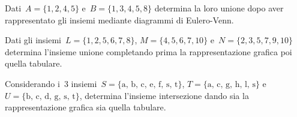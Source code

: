 \begin{esercizio}
 \label{ese:7.7}
Dati~$A=\{1,2,4,5\}$ e~$B=\{1,3,4,5,8\}$ determina la loro unione dopo
aver rappresentato gli insiemi mediante diagrammi di Eulero-Venn.
 \end{esercizio}

\begin{esercizio}
 \label{ese:7.8}
 Dati gli insiemi~$L=\{1,2,5,6,7,8\}$, $M=\{4,5,6,7,10\}$ e~$N=\{2,3,5,7,9,10\}$
determina l'insieme unione completando prima la rappresentazione
grafica poi quella tabulare.
\begin{center}
 
\end{center}
\end{esercizio}

% 
% 
% 

\begin{esercizio}
 \label{ese:7.12}
Considerando i~3 insiemi~$S=\{\text{a, b, c, e, f, s, t}\}$, $T=\{\text{a, c, g, 
h, l, s}\}$ e~$U=\{\text{b, c, d, g, s, t}\}$,
determina l'insieme intersezione dando sia la rappresentazione grafica sia 
quella tabulare.
 \end{esercizio}

